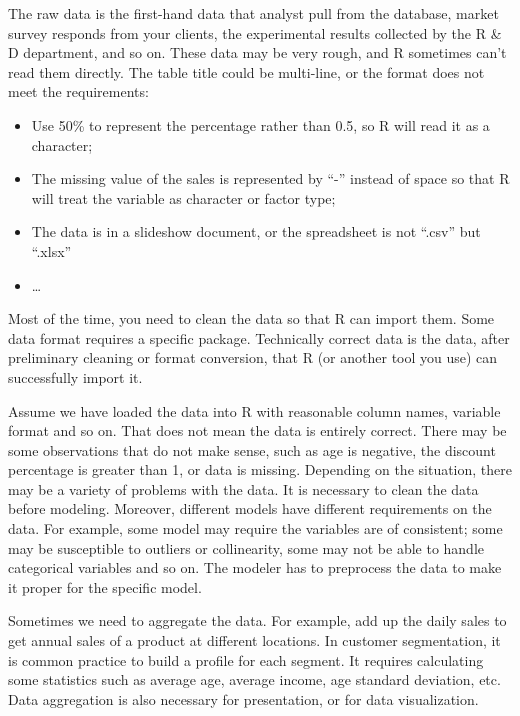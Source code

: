 \documentclass[]{book}
\providecommand{\tightlist}{%
  \setlength{\itemsep}{0pt}\setlength{\parskip}{0pt}}
\theoremstyle{definition}
\theoremstyle{definition}
\theoremstyle{remark}
\begin{document}
The raw data is the first-hand data that analyst pull from the database,
market survey responds from your clients, the experimental results
collected by the R \& D department, and so on. These data may be very
rough, and R sometimes can't read them directly. The table title could
be multi-line, or the format does not meet the requirements:

\begin{itemize}
\tightlist
\item
  Use 50\% to represent the percentage rather than 0.5, so R will read
  it as a character;
\item
  The missing value of the sales is represented by ``-'' instead of
  space so that R will treat the variable as character or factor type;
\item
  The data is in a slideshow document, or the spreadsheet is not
  ``.csv'' but ``.xlsx''
\item
  \ldots{}
\end{itemize}

Most of the time, you need to clean the data so that R can import them.
Some data format requires a specific package. Technically correct data
is the data, after preliminary cleaning or format conversion, that R (or
another tool you use) can successfully import it.

Assume we have loaded the data into R with reasonable column names,
variable format and so on. That does not mean the data is entirely
correct. There may be some observations that do not make sense, such as
age is negative, the discount percentage is greater than 1, or data is
missing. Depending on the situation, there may be a variety of problems
with the data. It is necessary to clean the data before modeling.
Moreover, different models have different requirements on the data. For
example, some model may require the variables are of consistent; some
may be susceptible to outliers or collinearity, some may not be able to
handle categorical variables and so on. The modeler has to preprocess
the data to make it proper for the specific model.

Sometimes we need to aggregate the data. For example, add up the daily
sales to get annual sales of a product at different locations. In
customer segmentation, it is common practice to build a profile for each
segment. It requires calculating some statistics such as average age,
average income, age standard deviation, etc. Data aggregation is also
necessary for presentation, or for data visualization.
\end{document}

